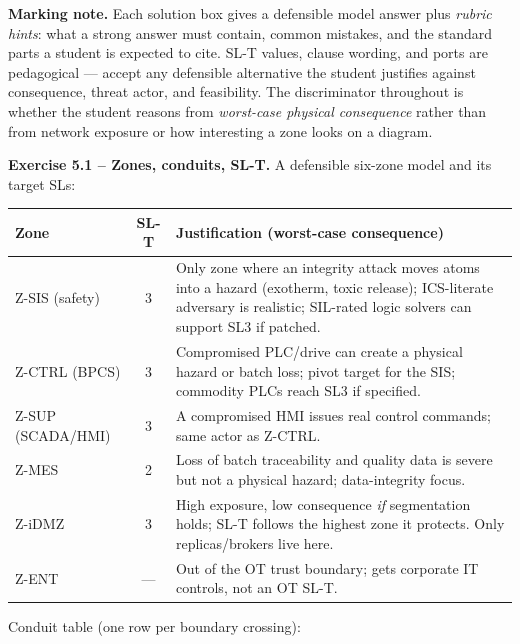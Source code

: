 \documentclass[11pt,a4paper]{article}
\begin{document}
\sheetheader

\noindent\textbf{Marking note.} Each solution box gives a defensible model answer plus \emph{rubric hints}: what a strong answer must contain, common mistakes, and the standard parts a student is expected to cite. SL-T values, clause wording, and ports are pedagogical --- accept any defensible alternative the student justifies against consequence, threat actor, and feasibility. The discriminator throughout is whether the student reasons from \emph{worst-case physical consequence} rather than from network exposure or how interesting a zone looks on a diagram.

\begin{solutionbox}
\textbf{Exercise 5.1 -- Zones, conduits, SL-T.}
A defensible six-zone model and its target SLs:

\renewcommand{\arraystretch}{1.15}
\footnotesize
\par\begin{tabular}{|p{2.4cm}|c|p{9.2cm}|}
\hline
\textbf{Zone} & \textbf{SL-T} & \textbf{Justification (worst-case consequence)} \\
\hline
Z-SIS (safety) & 3 & Only zone where an integrity attack moves atoms into a hazard (exotherm, toxic release); ICS-literate adversary is realistic; SIL-rated logic solvers can support SL3 if patched. \\
Z-CTRL (BPCS) & 3 & Compromised PLC/drive can create a physical hazard or batch loss; pivot target for the SIS; commodity PLCs reach SL3 if specified. \\
Z-SUP (SCADA/HMI) & 3 & A compromised HMI issues real control commands; same actor as Z-CTRL. \\
Z-MES & 2 & Loss of batch traceability and quality data is severe but not a physical hazard; data-integrity focus. \\
Z-iDMZ & 3 & High exposure, low consequence \emph{if} segmentation holds; SL-T follows the highest zone it protects. Only replicas/brokers live here. \\
Z-ENT & --- & Out of the OT trust boundary; gets corporate IT controls, not an OT SL-T. \\
\hline
\end{tabular}

\par\vspace{2mm}
\noindent Conduit table (one row per boundary crossing):


\end{solutionbox}
\end{document}
